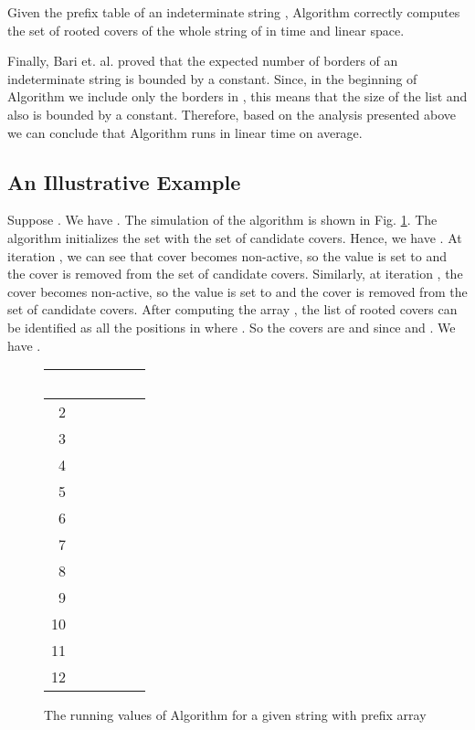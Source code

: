 \documentclass[runningheads,a4paper]{llncs}
\def\s#1{\mbox{\boldmath }}
\begin{document}
\begin{theorem}
Given the prefix table  of an indeterminate string , Algorithm  correctly computes the set of rooted covers
of the whole string of \s{x} in  time and  linear space.
\end{theorem} 

Finally, Bari et. al. \cite{BRS09} proved that the expected number
of borders of an indeterminate string is bounded by a constant.
Since, in the beginning of Algorithm  we include only the borders in
, this means that the size of the list  and also
 is bounded by a constant. Therefore, based on the analysis
presented above we can conclude that Algorithm  runs in linear time
on average.

\subsection{An Illustrative Example}
Suppose .
We have . The simulation of the algorithm is shown in Fig.
\ref{PCInd-ex}. The algorithm initializes the set  with the set of 
candidate covers. Hence, we have . At iteration 
, we can see that cover  becomes non-active, so the value 
is set to  and the cover  is removed from the set of candidate covers.
Similarly, at iteration , the cover  becomes
non-active, so the value  is set to  and the cover  is
removed from the set of candidate covers. After computing the array ,
the list of rooted covers can be identified as all the positions  in
 where . So the covers are  and  since
 and . We have .

\begin{figure}[htbp]
\centering 
\begin{tabular}{r|l|l}
	 ~ & ~  ~ & ~  \\
	\hline
	2 ~ & ~  ~ & ~   \\
	3 ~ & ~ ~ & ~  \\
	4 ~ & ~ ~ & ~  \\
	5 ~ & ~ ~ & ~  \\
	6 ~ & ~ ~ & ~  \\
	7 ~ & ~ ~ & ~  \\
	8 ~ & ~ ~ & ~  \\
	9 ~ & ~ ~ & ~  \\
	10 ~ & ~ ~ & ~  \\
	11 ~ & ~ ~ & ~  \\
	12 ~ & ~ ~ & ~ 
\end{tabular}
\caption{The running values of Algorithm  for a given string
with prefix array }
\label{PCInd-ex} 
\end{figure}
\end{document}
